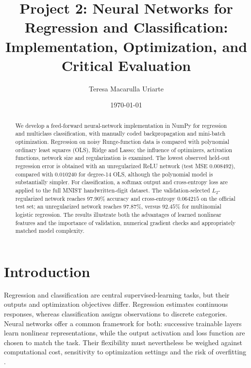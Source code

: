 \documentclass[aps,rmp,reprint,amsmath,amssymb,graphicx,longbibliography]{revtex4-1}
\begin{document}
\title{Project 2: Neural Networks for Regression and Classification: Implementation, Optimization, and Critical Evaluation}

\author{Teresa Macarulla Uriarte}
\date{\today}

\begin{abstract}
We develop a feed-forward neural-network implementation in NumPy for regression and
multiclass classification, with manually coded backpropagation and mini-batch
optimization. Regression on noisy Runge-function data is compared with polynomial
ordinary least squares (OLS), Ridge and Lasso; the influence of optimizers,
activation functions, network size and regularization is examined. The lowest
observed held-out regression error is obtained with an unregularized ReLU network
(test MSE $0.008492$), compared with $0.010240$ for degree-14 OLS, although the
polynomial model is substantially simpler. For classification, a softmax output
and cross-entropy loss are applied to the full MNIST handwritten-digit dataset.
The validation-selected $L_2$-regularized network reaches $97.90\%$ accuracy
and cross-entropy $0.064215$ on the official test set; an unregularized network
reaches $97.87\%$, versus $92.45\%$ for multinomial logistic regression.
The results illustrate both the advantages of learned nonlinear features and
the importance of validation, numerical gradient checks and appropriately
matched model complexity.
\end{abstract}

\maketitle

\tableofcontents

\section{Introduction}

Regression and classification are central supervised-learning tasks, but their
outputs and optimization objectives differ. Regression estimates continuous
responses, whereas classification assigns observations to discrete categories.
Neural networks offer a common framework for both: successive trainable layers
learn nonlinear representations, while the output activation and loss function
are chosen to match the task. Their flexibility must nevertheless be weighed
against computational cost, sensitivity to optimization settings and the risk
of overfitting \cite{Book_Ch8}.
\end{document}
